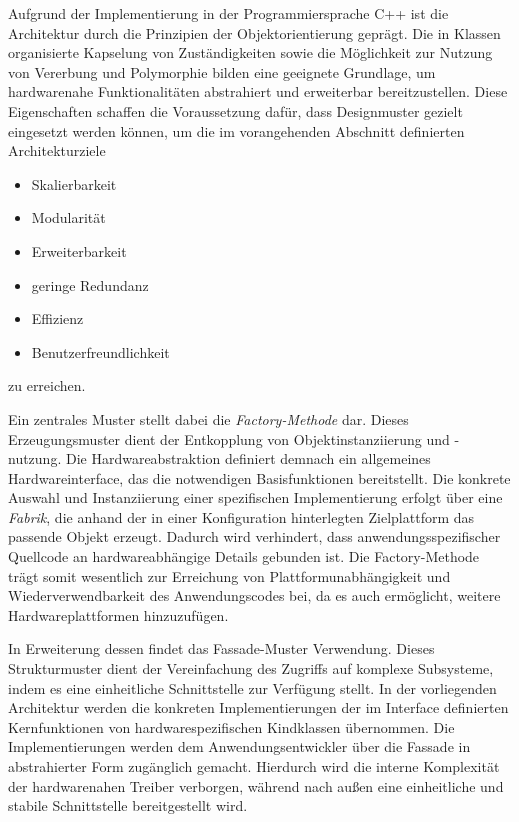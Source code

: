 Aufgrund der Implementierung in der Programmiersprache C++ ist die Architektur durch die Prinzipien der Objektorientierung geprägt. 
Die in Klassen organisierte Kapselung von Zuständigkeiten sowie die Möglichkeit zur Nutzung von Vererbung und Polymorphie bilden eine geeignete Grundlage, um hardwarenahe Funktionalitäten abstrahiert und erweiterbar bereitzustellen. 
Diese Eigenschaften schaffen die Voraussetzung dafür, dass Designmuster gezielt eingesetzt werden können, um die im vorangehenden Abschnitt definierten Architekturziele
\begin{itemize}
	\item Skalierbarkeit
	\item Modularität
	\item Erweiterbarkeit
	\item geringe Redundanz
	\item Effizienz
	\item Benutzerfreundlichkeit
\end{itemize}
 zu erreichen.

Ein zentrales Muster stellt dabei die \textit{Factory-Methode} dar.
Dieses Erzeugungsmuster dient der Entkopplung von Objektinstanziierung und -nutzung.
Die Hardwareabstraktion definiert demnach ein allgemeines Hardwareinterface, das die notwendigen Basisfunktionen bereitstellt.
Die konkrete Auswahl und Instanziierung einer spezifischen Implementierung erfolgt über eine \textit{Fabrik}, die anhand der in einer Konfiguration hinterlegten Zielplattform das passende Objekt erzeugt.
Dadurch wird verhindert, dass anwendungsspezifischer Quellcode an hardwareabhängige Details gebunden ist.
Die Factory-Methode trägt somit wesentlich zur Erreichung von Plattformunabhängigkeit und Wiederverwendbarkeit des Anwendungscodes bei, da es auch ermöglicht, weitere Hardwareplattformen hinzuzufügen.

In Erweiterung dessen findet das Fassade-Muster Verwendung. 
Dieses Strukturmuster dient der Vereinfachung des Zugriffs auf komplexe Subsysteme, indem es eine einheitliche Schnittstelle zur Verfügung stellt. 
In der vorliegenden Architektur werden die konkreten Implementierungen der im Interface definierten Kernfunktionen von hardwarespezifischen Kindklassen übernommen. 
Die Implementierungen werden dem Anwendungsentwickler über die Fassade in abstrahierter Form zugänglich gemacht. 
Hierdurch wird die interne Komplexität der hardwarenahen Treiber verborgen, während nach außen eine einheitliche und stabile Schnittstelle bereitgestellt wird.

